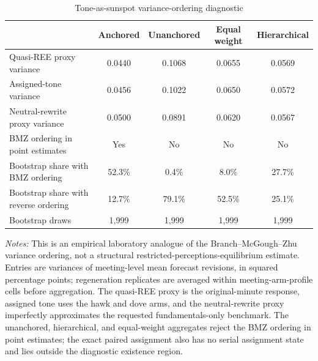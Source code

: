 \begin{table}[htbp]
\color{revisionred}
\centering
\begin{threeparttable}
\caption{Tone-as-sunspot variance-ordering diagnostic}
\label{tab:sunspot-ordering}
\begin{scriptsize}
\setlength{\tabcolsep}{3.6pt}
\begin{tabular}{lcccc}
\toprule
 & Anchored & Unanchored & Equal weight & Hierarchical \\
\midrule
Quasi-REE proxy variance & 0.0440 & 0.1068 & 0.0655 & 0.0569 \\
Assigned-tone variance & 0.0456 & 0.1022 & 0.0650 & 0.0572 \\
Neutral-rewrite proxy variance & 0.0500 & 0.0891 & 0.0620 & 0.0567 \\
\midrule
BMZ ordering in point estimates & Yes & No & No & No \\
Bootstrap share with BMZ ordering & 52.3\% & 0.4\% & 8.0\% & 27.7\% \\
Bootstrap share with reverse ordering & 12.7\% & 79.1\% & 52.5\% & 25.1\% \\
Bootstrap draws & 1,999 & 1,999 & 1,999 & 1,999 \\
\bottomrule
\end{tabular}
\begin{tablenotes}[flushleft]
\scriptsize
\item \textit{Notes:} This is an empirical laboratory analogue of the Branch--McGough--Zhu variance ordering, not a structural restricted-perceptions-equilibrium estimate. Entries are variances of meeting-level mean forecast revisions, in squared percentage points; regeneration replicates are averaged within meeting-arm-profile cells before aggregation. The quasi-REE proxy is the original-minute response, assigned tone uses the hawk and dove arms, and the neutral-rewrite proxy imperfectly approximates the requested fundamentals-only benchmark. The unanchored, hierarchical, and equal-weight aggregates reject the BMZ ordering in point estimates; the exact paired assignment also has no serial assignment state and lies outside the diagnostic existence region.
\end{tablenotes}
\end{scriptsize}
\end{threeparttable}
\end{table}
